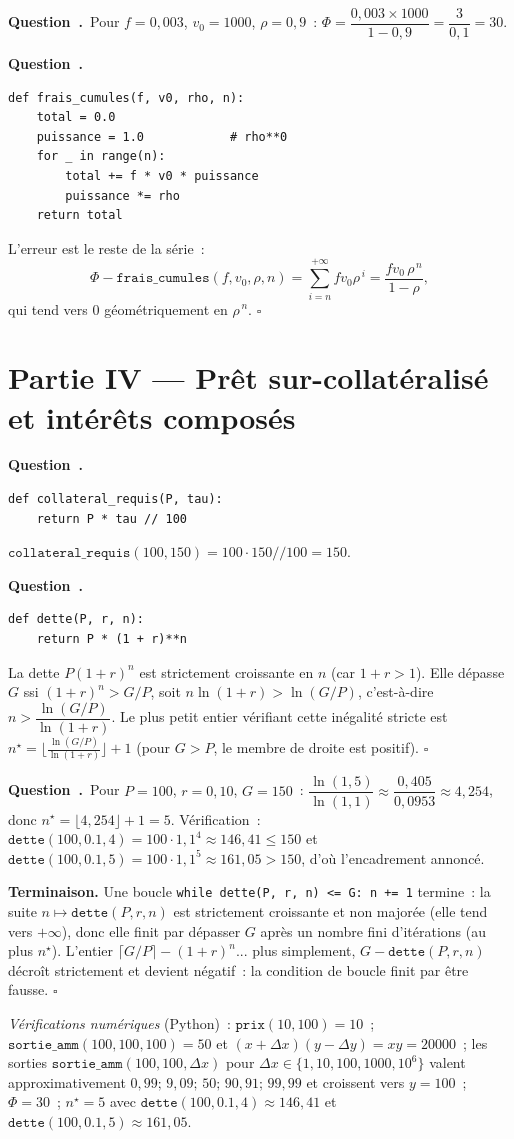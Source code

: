 \documentclass[11pt,a4paper]{article}
\newcounter{qcnt}
\newcommand{\Q}{\medskip\par\stepcounter{qcnt}\noindent\textbf{Question~\theqcnt.}~}
\newcommand{\code}[1]{\lstinline!#1!}
\begin{document}
\Q Pour $f=0{,}003$, $v_0=1000$, $\rho=0{,}9$~:
$\Phi = \dfrac{0{,}003 \times 1000}{1 - 0{,}9} = \dfrac{3}{0{,}1} = 30.$

\Q
\begin{lstlisting}
def frais_cumules(f, v0, rho, n):
    total = 0.0
    puissance = 1.0            # rho**0
    for _ in range(n):
        total += f * v0 * puissance
        puissance *= rho
    return total
\end{lstlisting}
L'erreur est le reste de la série~:
$$\Phi - \mathtt{frais\_cumules}(f,v_0,\rho,n)
= \sum_{i=n}^{+\infty} f v_0 \rho^{\,i} = \frac{f v_0\,\rho^{\,n}}{1-\rho},$$
qui tend vers $0$ géométriquement en $\rho^{\,n}$. $\square$

\section*{Partie IV --- Prêt sur-collatéralisé et intérêts composés}

\Q
\begin{lstlisting}
def collateral_requis(P, tau):
    return P * tau // 100
\end{lstlisting}
$\mathtt{collateral\_requis}(100,150) = 100\cdot150 // 100 = 150$.

\Q
\begin{lstlisting}
def dette(P, r, n):
    return P * (1 + r)**n
\end{lstlisting}
La dette $P(1+r)^n$ est strictement croissante en $n$ (car $1+r>1$). Elle dépasse $G$ ssi
$(1+r)^n > G/P$, soit $n \ln(1+r) > \ln(G/P)$, c'est-à-dire $n > \dfrac{\ln(G/P)}{\ln(1+r)}$. Le
plus petit entier vérifiant cette inégalité stricte est
$n^{\star} = \bigl\lfloor \tfrac{\ln(G/P)}{\ln(1+r)} \bigr\rfloor + 1$ (pour $G > P$, le membre de
droite est positif). $\square$

\Q Pour $P=100$, $r=0{,}10$, $G=150$~: $\dfrac{\ln(1{,}5)}{\ln(1{,}1)} \approx
\dfrac{0{,}405}{0{,}0953} \approx 4{,}254$, donc $n^{\star} = \lfloor 4{,}254\rfloor + 1 = 5$.
Vérification~: $\mathtt{dette}(100,0.1,4) = 100\cdot1{,}1^4 \approx 146{,}41 \le 150$ et
$\mathtt{dette}(100,0.1,5) = 100\cdot1{,}1^5 \approx 161{,}05 > 150$, d'où l'encadrement annoncé.

\noindent\textbf{Terminaison.} Une boucle \code{while dette(P, r, n) <= G: n += 1} termine~: la
suite $n \mapsto \mathtt{dette}(P,r,n)$ est strictement croissante et non majorée (elle tend vers
$+\infty$), donc elle finit par dépasser $G$ après un nombre fini d'itérations (au plus
$n^{\star}$). L'entier $\lceil G/P\rceil - (1+r)^n$... plus simplement, $G - \mathtt{dette}(P,r,n)$
décroît strictement et devient négatif~: la condition de boucle finit par être fausse. $\square$

\medskip
\noindent\emph{Vérifications numériques} (Python)~: $\mathtt{prix}(10,100)=10$~;
$\mathtt{sortie\_amm}(100,100,100)=50$ et $(x+\Delta x)(y-\Delta y)=xy=20000$~; les sorties
$\mathtt{sortie\_amm}(100,100,\Delta x)$ pour $\Delta x \in \{1,10,100,1000,10^6\}$ valent
approximativement $0{,}99;\,9{,}09;\,50;\,90{,}91;\,99{,}99$ et croissent vers $y=100$~;
$\Phi = 30$~; $n^{\star}=5$ avec $\mathtt{dette}(100,0.1,4)\approx146{,}41$ et
$\mathtt{dette}(100,0.1,5)\approx161{,}05$.
\end{document}
